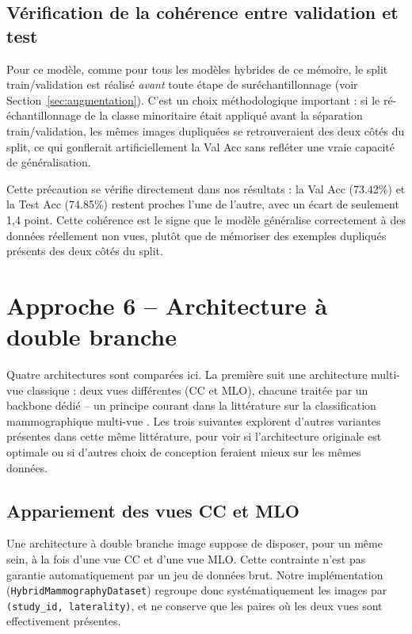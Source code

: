 \documentclass[12pt,a4paper]{report}
\begin{document}
\subsection{Vérification de la cohérence entre validation et test}
\label{sec:coherence-val-test}

Pour ce modèle, comme pour tous les modèles hybrides de ce mémoire, le
split train/validation est réalisé \emph{avant} toute étape de
suréchantillonnage (voir Section~\ref{sec:augmentation}). C'est un choix
méthodologique important : si le ré-échantillonnage de la classe
minoritaire était appliqué avant la séparation train/validation, les mêmes
images dupliquées se retrouveraient des deux côtés du split, ce qui
gonflerait artificiellement la Val Acc sans refléter une vraie capacité de
généralisation.

Cette précaution se vérifie directement dans nos résultats : la Val Acc
(73.42\%) et la Test Acc (74.85\%) restent proches l'une de l'autre, avec
un écart de seulement 1,4 point. Cette cohérence est le signe que le
modèle généralise correctement à des données réellement non vues, plutôt
que de mémoriser des exemples dupliqués présents des deux côtés du split.

\section{Approche 6 -- Architecture à double branche}
\label{sec:approche6}

Quatre architectures sont comparées ici. La première suit une architecture
multi-vue classique : deux vues différentes (CC et MLO), chacune traitée
par un backbone dédié -- un principe courant dans la littérature sur la
classification mammographique multi-vue \cite{ref9, ref14}. Les trois
suivantes explorent d'autres variantes présentes dans cette même
littérature, pour voir si l'architecture originale est optimale ou si
d'autres choix de conception feraient mieux sur les mêmes données.

\subsection{Appariement des vues CC et MLO}

Une architecture à double branche image suppose de disposer, pour un même
sein, à la fois d'une vue CC et d'une vue MLO. Cette contrainte n'est pas
garantie automatiquement par un jeu de données brut. Notre implémentation
(\texttt{HybridMammographyDataset}) regroupe donc systématiquement les
images par \texttt{(study\_id, laterality)}, et ne conserve que les paires
où les deux vues sont effectivement présentes.
\end{document}

